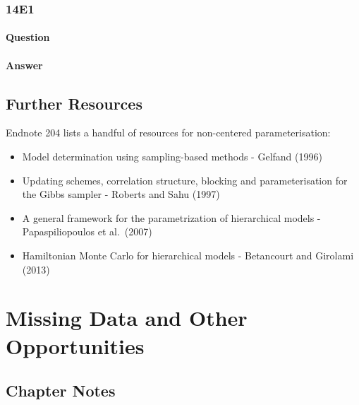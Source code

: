 \documentclass[
]{book}
\providecommand{\tightlist}{%
  \setlength{\itemsep}{0pt}\setlength{\parskip}{0pt}}
\begin{document}
\hypertarget{e1-11}{%
\subsection*{14E1}\label{e1-11}}

\hypertarget{question-100}{%
\subsubsection*{Question}\label{question-100}}

\hypertarget{answer-100}{%
\subsubsection*{Answer}\label{answer-100}}

\hypertarget{further-resources-4}{%
\section*{Further Resources}\label{further-resources-4}}

Endnote 204 lists a handful of resources for non-centered parameterisation:

\begin{itemize}
\tightlist
\item
  Model determination using sampling-based methods - Gelfand (1996)
\item
  Updating schemes, correlation structure, blocking and parameterisation for the Gibbs sampler - Roberts and Sahu (1997)
\item
  A general framework for the parametrization of hierarchical models - Papaspiliopoulos et al.~(2007)
\item
  Hamiltonian Monte Carlo for hierarchical models - Betancourt and Girolami (2013)
\end{itemize}

\hypertarget{missing_data}{%
\chapter{Missing Data and Other Opportunities}\label{missing_data}}

\hypertarget{chapter-notes-14}{%
\section{Chapter Notes}\label{chapter-notes-14}}
\end{document}
